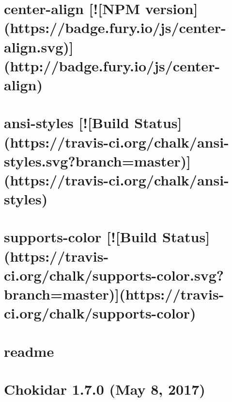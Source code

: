 \documentclass[twoside]{book}
\newcommand{\+}{\discretionary{\mbox{\scriptsize$\hookleftarrow$}}{}{}}
\begin{document}
\chapter{center-\/align \mbox{[}!\mbox{[}N\+PM version\mbox{]}(https\+://badge.fury.\+io/js/center-\/align.svg)\mbox{]}(http\+://badge.fury.\+io/js/center-\/align)}
\label{md__c_1_workspace_demo_src_main_script_node_modules_center-align__r_e_a_d_m_e}

\chapter{ansi-\/styles \mbox{[}!\mbox{[}Build Status\mbox{]}(https\+://travis-\/ci.org/chalk/ansi-\/styles.svg?branch=master)\mbox{]}(https\+://travis-\/ci.org/chalk/ansi-\/styles)}
\label{md__c_1_workspace_demo_src_main_script_node_modules_chalk_node_modules_ansi-styles_readme}

\chapter{supports-\/color \mbox{[}!\mbox{[}Build Status\mbox{]}(https\+://travis-\/ci.org/chalk/supports-\/color.svg?branch=master)\mbox{]}(https\+://travis-\/ci.org/chalk/supports-\/color)}
\label{md__c_1_workspace_demo_src_main_script_node_modules_chalk_node_modules_supports-color_readme}

\chapter{readme}
\label{md__c_1_workspace_demo_src_main_script_node_modules_chalk_readme}

\chapter{Chokidar 1.7.0 (May 8, 2017)}
\label{md__c_1_workspace_demo_src_main_script_node_modules_chokidar__c_h_a_n_g_e_l_o_g}

\end{document}
